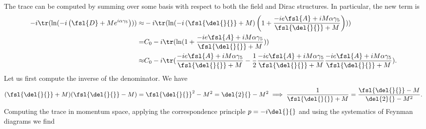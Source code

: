 The trace can be computed by summing over some basis with respect to both the field and Dirac structures. In particular, the new term is
\begin{align*}
	-i\tr(\ln(-i\left(\fsl{D} + Me^{i\alpha\gamma_{5}}\right))) \approx& 	-i\tr(\ln(-i\left(\fsl{\del{}{}} + M\right)\left(1 + \frac{-ie\fsl{A} + iM\alpha\gamma_{5}}{\fsl{\del{}{}} + M}\right))) \\
	=& C_{0} - i\tr(\ln(1 + \frac{-ie\fsl{A} + iM\alpha\gamma_{5}}{\fsl{\del{}{}} + M})) \\
	\approx& C_{0} - i\tr(\frac{-ie\fsl{A} + iM\alpha\gamma_{5}}{\fsl{\del{}{}} + M} - \frac{1}{2}\frac{-ie\fsl{A} + iM\alpha\gamma_{5}}{\fsl{\del{}{}} + M}\frac{-ie\fsl{A} + iM\alpha\gamma_{5}}{\fsl{\del{}{}} + M}).
\end{align*}
Let us first compute the inverse of the denominator. We have
\begin{align*}
	(\fsl{\del{}{}} + M)(\fsl{\del{}{}} - M) = \fsl{\del{}{}}^{2} - M^{2} = \del{2}{} - M^{2} \implies \frac{1}{\fsl{\del{}{}} + M} = \frac{\fsl{\del{}{}} - M}{\del{2}{} - M^{2}}.
\end{align*}
Computing the trace in momentum space, applying the correspondence principle $p = -i\del{}{}$ and using the systematics of Feynman diagrams we find
